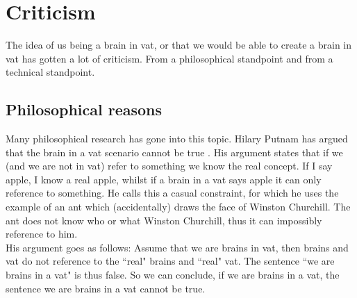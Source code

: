 \documentclass[a4paper]{article}
\begin{document}
 
\section{Criticism}
The idea of us being a brain in vat, or that we would be able to create a brain in vat has gotten a lot of criticism. From a philosophical standpoint and from a technical standpoint.

\subsection{Philosophical reasons}
Many philosophical research has gone into this topic. Hilary Putnam has argued that the brain in a vat scenario cannot be true \cite{Putnam}. His argument states that if we (and we are not in vat) refer to something we know the real concept. If I say apple, I know a real apple, whilst if a brain in a vat says apple it can only reference to something. He calls this a casual constraint, for which he uses the example of an ant which (accidentally) draws the face of Winston Churchill. The ant does not know who or what Winston Churchill, thus it can impossibly reference to him.\\
His argument goes as follows: Assume that we are brains in vat, then brains and vat do not reference to the ``real" brains and ``real" vat. The sentence ``we are brains in a vat" is thus false. So we can conclude, if we are brains in a vat, the sentence we are brains in a vat cannot be true.\\
\end{document}
